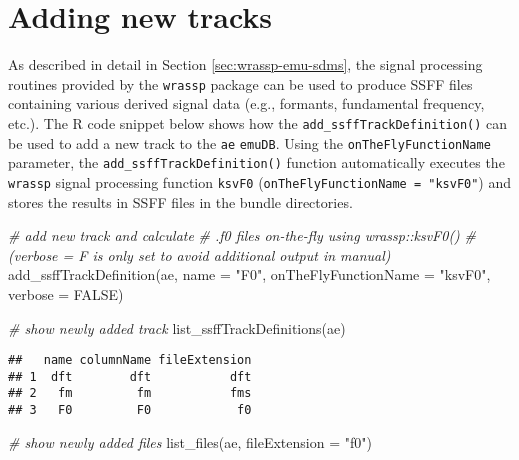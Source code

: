 \documentclass[
]{book}
\newenvironment{Shaded}{\begin{snugshade}}{\end{snugshade}}
\newcommand{\AttributeTok}[1]{\textcolor[rgb]{0.77,0.63,0.00}{#1}}
\newcommand{\CommentTok}[1]{\textcolor[rgb]{0.56,0.35,0.01}{\textit{#1}}}
\newcommand{\ConstantTok}[1]{\textcolor[rgb]{0.00,0.00,0.00}{#1}}
\newcommand{\FunctionTok}[1]{\textcolor[rgb]{0.00,0.00,0.00}{#1}}
\newcommand{\NormalTok}[1]{#1}
\newcommand{\StringTok}[1]{\textcolor[rgb]{0.31,0.60,0.02}{#1}}
\begin{document}
\hypertarget{adding-new-tracks}{%
\section{Adding new tracks}\label{adding-new-tracks}}

As described in detail in Section \ref{sec:wrassp-emu-sdms}, the signal processing routines provided by the \texttt{wrassp} package can be used to produce SSFF files containing various derived signal data (e.g., formants, fundamental frequency, etc.). The R code snippet below shows how the \texttt{add\_ssffTrackDefinition()} can be used to add a new track to the \texttt{ae} \texttt{emuDB}. Using the \texttt{onTheFlyFunctionName} parameter, the \texttt{add\_ssffTrackDefinition()} function automatically executes the \texttt{wrassp} signal processing function \texttt{ksvF0} (\texttt{onTheFlyFunctionName\ =\ "ksvF0"}) and stores the results in SSFF files in the bundle directories.

\begin{Shaded}
\begin{Highlighting}[]
\CommentTok{\# add new track and calculate}
\CommentTok{\# .f0 files on{-}the{-}fly using wrassp::ksvF0()}
\CommentTok{\# (verbose = F is only set to avoid additional output in manual)}
\FunctionTok{add\_ssffTrackDefinition}\NormalTok{(ae,}
                        \AttributeTok{name =} \StringTok{"F0"}\NormalTok{,}
                        \AttributeTok{onTheFlyFunctionName =} \StringTok{"ksvF0"}\NormalTok{,}
                        \AttributeTok{verbose =} \ConstantTok{FALSE}\NormalTok{)}

\CommentTok{\# show newly added track}
\FunctionTok{list\_ssffTrackDefinitions}\NormalTok{(ae)}
\end{Highlighting}
\end{Shaded}

\begin{verbatim}
##   name columnName fileExtension
## 1  dft        dft           dft
## 2   fm         fm           fms
## 3   F0         F0            f0
\end{verbatim}

\begin{Shaded}
\begin{Highlighting}[]
\CommentTok{\# show newly added files}
\FunctionTok{list\_files}\NormalTok{(ae, }\AttributeTok{fileExtension =} \StringTok{"f0"}\NormalTok{)}
\end{Highlighting}
\end{Shaded}
\end{document}
